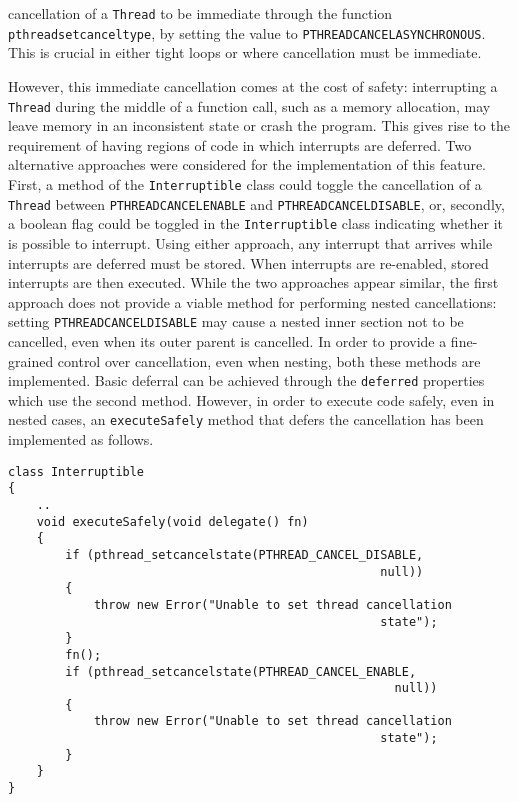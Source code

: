 cancellation of a \texttt{Thread} to be immediate through the function 
\texttt{pthread\textunderscore{}setcanceltype}, by setting the value to 
\texttt{PTHREAD\textunderscore{}CANCEL\textunderscore{}ASYNCHRONOUS}. This is 
crucial in either tight loops or where cancellation must be immediate. 
\par\bigskip\noindent
However, this immediate cancellation comes at the cost of safety: interrupting a 
\texttt{Thread} during the middle of a function call, such as a memory allocation, 
may leave memory in an inconsistent state or crash the program. 
This gives rise to the requirement of having regions of code in which
interrupts are deferred. 
Two alternative approaches were considered for the implementation 
of this feature. First, a method of the 
\texttt{Interruptible} class could toggle the cancellation of a
\texttt{Thread} between \texttt{PTHREAD\textunderscore{}CANCEL\textunderscore{}ENABLE}
and \texttt{PTHREAD\textunderscore{}CANCEL\textunderscore{}DISABLE}, or,
secondly,
a boolean flag could be toggled in the \texttt{Interruptible} class indicating
whether it is possible to interrupt. 
Using either approach, any interrupt that arrives while interrupts are deferred
must be stored. When interrupts are re-enabled, stored interrupts are then
executed. 
While the two approaches appear similar, the first approach does 
not provide a viable method for performing nested cancellations: setting 
\texttt{PTHREAD\textunderscore{}CANCEL\textunderscore{}DISABLE} may cause a
nested inner section not to be cancelled, even when its outer parent  is cancelled. 
In order to provide a fine-grained control over cancellation, 
even when nesting, both these methods are implemented. 
Basic deferral can be achieved through the \texttt{deferred} properties which
use the second method. However, in order 
to execute code safely, even in nested cases, an \texttt{executeSafely} method that 
defers the cancellation has been implemented as follows. 
\begin{lstlisting}[basicstyle=\small]
class Interruptible
{
    ..
    void executeSafely(void delegate() fn)
    {
        if (pthread_setcancelstate(PTHREAD_CANCEL_DISABLE, 
                                                    null))
        {
            throw new Error("Unable to set thread cancellation 
                                                    state");
        }
        fn();
        if (pthread_setcancelstate(PTHREAD_CANCEL_ENABLE, 
                                                      null))
        {
            throw new Error("Unable to set thread cancellation 
                                                    state");
        }
    }
}
\end{lstlisting}
